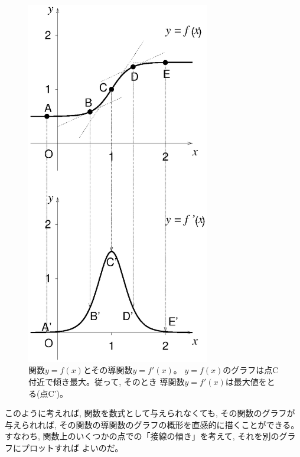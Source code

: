 \begin{figure}[!h]
    \centering
    \includegraphics[width=8cm]{diff_graph.eps}
    \caption{関数$y=f(x)$とその導関数$y=f'(x)$。
$y=f(x)$のグラフは点C付近で傾き最大。従って, そのとき
導関数$y=f'(x)$は最大値をとる(点C')。\label{fig:diff_graph}}
\end{figure}

このように考えれば, 関数を数式として与えられなくても, その関数のグラフが与えられれば, 
その関数の導関数のグラフの概形を直感的に描くことができる。すなわち, 
関数上のいくつかの点での「接線の傾き」を考えて, それを別のグラフにプロットすれば
よいのだ。

